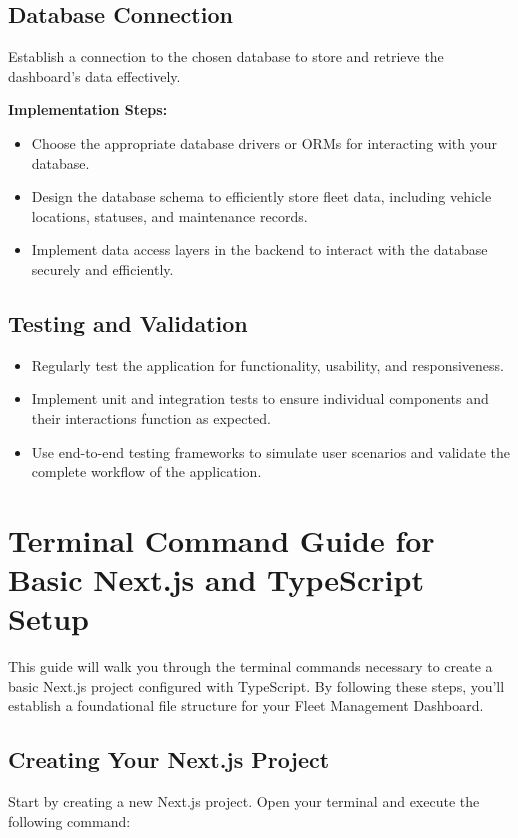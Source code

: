 \subsection*{Database Connection}
Establish a connection to the chosen database to store and retrieve the dashboard's data effectively.

\textbf{Implementation Steps:}
\begin{itemize}
    \item Choose the appropriate database drivers or ORMs for interacting with your database.
    \item Design the database schema to efficiently store fleet data, including vehicle locations, statuses, and maintenance records.
    \item Implement data access layers in the backend to interact with the database securely and efficiently.
\end{itemize}

\subsection*{Testing and Validation}
\begin{itemize}
    \item Regularly test the application for functionality, usability, and responsiveness.
    \item Implement unit and integration tests to ensure individual components and their interactions function as expected.
    \item Use end-to-end testing frameworks to simulate user scenarios and validate the complete workflow of the application.
\end{itemize}


\section*{Terminal Command Guide for Basic Next.js and TypeScript Setup}

This guide will walk you through the terminal commands necessary to create a basic Next.js project configured with TypeScript. By following these steps, you'll establish a foundational file structure for your Fleet Management Dashboard.

\subsection*{Creating Your Next.js Project}
Start by creating a new Next.js project. Open your terminal and execute the following command:


